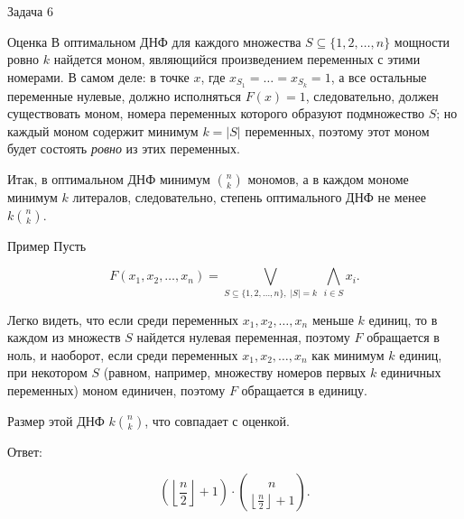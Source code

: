 \documentclass{article}
\newcommand{\abs}[1]{\left\lvert#1\right\rvert}
\newcommand{\floor}[1]{\left\lfloor#1\right\rfloor}
\begin{document}
\begin{section}{Задача 6}
\begin{subsection}{Оценка}
			В оптимальном ДНФ для каждого множества $S \subseteq \{1, 2, \dots, n\}$ мощности ровно $k$ найдется моном, являющийся произведением переменных с этими номерами. В самом деле: в точке $x$, где $x_{S_1} = \dots = x_{S_k} = 1$, а все остальные переменные нулевые, должно исполняться $F(x) = 1$, следовательно, должен существовать моном, номера переменных которого образуют подмножество $S$; но каждый моном содержит минимум $k = \abs{S}$ переменных, поэтому этот моном будет состоять \textit{ровно} из этих переменных.

			Итак, в оптимальном ДНФ минимум $\binom{n}{k}$ мономов, а в каждом мономе минимум $k$ литералов, следовательно, степень оптимального ДНФ не менее $k \binom{n}{k}$.
		\end{subsection}

		\begin{subsection}{Пример}
			Пусть

			\begin{equation*}
				F(x_1, x_2, \dots, x_n) = \bigvee_{S \subseteq \{1, 2, \dots, n\}, \; \abs{S} = k} \ \bigwedge_{i \in S} x_i.
			\end{equation*}

			Легко видеть, что если среди переменных $x_1, x_2, \dots, x_n$ меньше $k$ единиц, то в каждом из множеств $S$ найдется нулевая переменная, поэтому $F$ обращается в ноль, и наоборот, если среди переменных $x_1, x_2, \dots, x_n$ как минимум $k$ единиц, при некотором $S$ (равном, например, множеству номеров первых $k$ единичных переменных) моном единичен, поэтому $F$ обращается в единицу.

			Размер этой ДНФ $k \binom{n}{k}$, что совпадает с оценкой.
		\end{subsection}

		Ответ:

		\begin{equation*}
			\left( \floor{\frac{n}{2}} + 1 \right) \cdot \binom{n}{\floor{\frac{n}{2}} + 1}.
		\end{equation*}
	\end{section}
\end{document}
